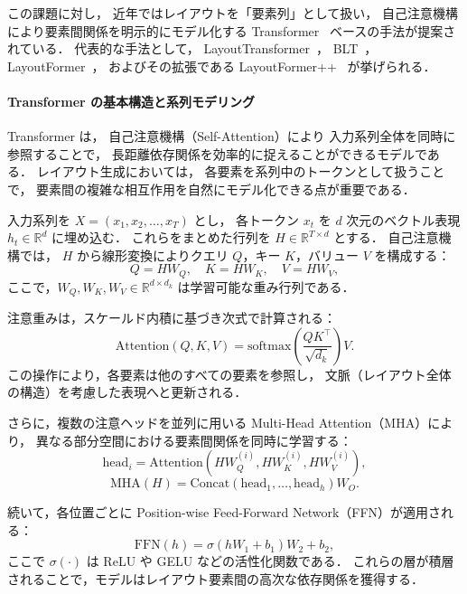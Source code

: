 \documentclass[a4j,12pt,dvipdfmx]{jsreport}
\begin{document}
この課題に対し，
近年ではレイアウトを「要素列」として扱い，
自己注意機構により要素間関係を明示的にモデル化する
Transformer~\cite{vaswani2017attention} ベースの手法が提案されている．
代表的な手法として，
LayoutTransformer~\cite{gupta2021layouttransformer}，
BLT~\cite{kong_blt_2022}，
LayoutFormer~\cite{jiang2023layoutformer}，
およびその拡張である LayoutFormer++~\cite{jiang_layoutformer_2023}
が挙げられる．

\paragraph{Transformer の基本構造と系列モデリング}
Transformer は，
自己注意機構（Self-Attention）により
入力系列全体を同時に参照することで，
長距離依存関係を効率的に捉えることができるモデルである．
レイアウト生成においては，
各要素を系列中のトークンとして扱うことで，
要素間の複雑な相互作用を自然にモデル化できる点が重要である．

入力系列を $X = (x_1, x_2, \ldots, x_T)$ とし，
各トークン $x_t$ を $d$ 次元のベクトル表現 $h_t \in \mathbb{R}^d$ に埋め込む．
これらをまとめた行列を $H \in \mathbb{R}^{T \times d}$ とする．
自己注意機構では，
$H$ から線形変換によりクエリ $Q$，キー $K$，バリュー $V$ を構成する：
\begin{equation}
   Q = H W_Q,\quad
   K = H W_K,\quad
   V = H W_V,
\end{equation}
ここで，$W_Q, W_K, W_V \in \mathbb{R}^{d \times d_k}$ は学習可能な重み行列である．

注意重みは，スケールド内積に基づき次式で計算される：
\begin{equation}
   \mathrm{Attention}(Q,K,V)
   =
   \mathrm{softmax}
   \left(
   \frac{QK^\top}{\sqrt{d_k}}
   \right)
   V.
\end{equation}
この操作により，各要素は他のすべての要素を参照し，
文脈（レイアウト全体の構造）を考慮した表現へと更新される．

さらに，複数の注意ヘッドを並列に用いる Multi-Head Attention（MHA）により，
異なる部分空間における要素間関係を同時に学習する：
\begin{equation}
   \mathrm{head}_i
   =
   \mathrm{Attention}
   (H W_Q^{(i)}, H W_K^{(i)}, H W_V^{(i)}),
\end{equation}
\begin{equation}
   \mathrm{MHA}(H)
   =
   \mathrm{Concat}(\mathrm{head}_1,\ldots,\mathrm{head}_h) W_O.
\end{equation}

続いて，各位置ごとに Position-wise Feed-Forward Network（FFN）が適用される：
\begin{equation}
   \mathrm{FFN}(h)
   =
   \sigma(h W_1 + b_1) W_2 + b_2,
\end{equation}
ここで $\sigma(\cdot)$ は ReLU や GELU などの活性化関数である．
これらの層が積層されることで，モデルはレイアウト要素間の高次な依存関係を獲得する．
\end{document}
